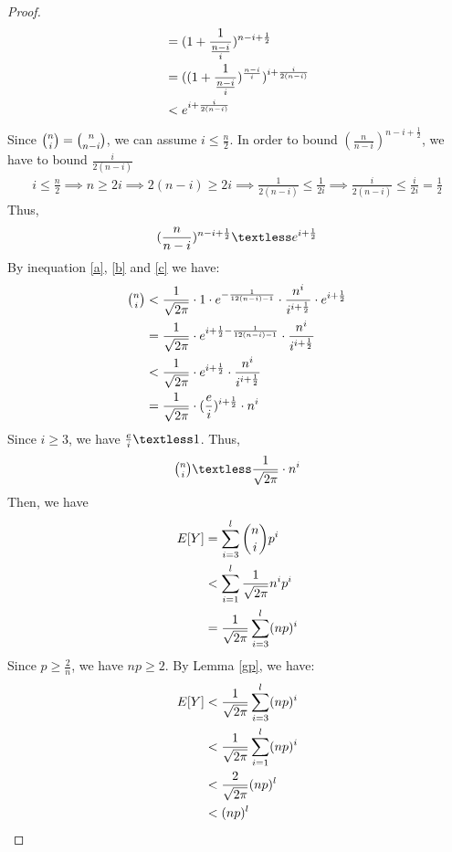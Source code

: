 \begin{proof}
\begin{align}
    \nonumber&= (1+\frac{1}{\frac{n-i}{i}})^{n-i+\frac{1}{2}}\\
    \nonumber&= ((1+\frac{1}{\frac{n-i}{i}})^{\frac{n-i}{i}})^{i+\frac{i}{2(n-i)}}\\
    \nonumber &\textless e^{i+\frac{i}{2(n-i)}}
\end{align}
Since $\tbinom{n}{i}=\tbinom{n}{n-i}$, 
we can assume $i\le \frac{n}{2}$. 
In order to bound $(\frac{n}{n-i})^{n-i+\frac{1}{2}}$, we have to bound $\frac{i}{2(n-i)}$
\begin{align}
   \nonumber i\le \frac{n}{2} 
   \implies n \ge 2i 
   \implies 2(n-i) \ge 2i \implies \frac{1}{2(n-i)} \le \frac{1}{2i} \implies  \frac{i}{2(n-i)} \le \frac{i}{2i} =\frac{1}{2}
\end{align}
Thus, 
\begin{align}
    (\frac{n}{n-i})^{n-i+\frac{1}{2}} \textless e^{i+\frac{1}{2}}\label{c}
\end{align}
By inequation \ref{a}, \ref{b} and \ref{c} we have:
\begin{align}
\nonumber \tbinom{n}{i} &\textless \frac{1}{\sqrt{2\pi}}\cdot 1\cdot e^{-\frac{1}{12(n-i)-1}} \cdot \frac{n^i}{i^{i+\frac{1}{2}}} \cdot e^{i+\frac{1}{2}}\\
\nonumber &= \frac{1}{\sqrt{2\pi}}\cdot e^{i+\frac{1}{2}-\frac{1}{12(n-i)-1}} \cdot \frac{n^i}{i^{i+\frac{1}{2}}}\\
\nonumber &\textless \frac{1}{\sqrt{2\pi}}\cdot e^{i+\frac{1}{2}} \cdot \frac{n^i}{i^{i+\frac{1}{2}}}\\
\nonumber &= \frac{1}{\sqrt{2\pi}}\cdot (\frac{e}{i})^{i+\frac{1}{2}}\cdot n^i
\end{align}
Since $i\ge 3$, we have $\frac{e}{i}\textless 1$. Thus,
\begin{align}
    \nonumber \tbinom{n}{i} \textless \frac{1}{\sqrt{2\pi}}\cdot n^i
\end{align}
Then, we have
\begin{align}
    \nonumber E[Y] &= \sum_{i = 3}^{l}{\binom{n}{i} p^i} 
    \\
    \nonumber &\textless \sum_{i=1}^{l}\frac{1}{\sqrt{2\pi}}n^ip^i\\
    \nonumber &= \frac{1}{\sqrt{2\pi}}\sum_{i=3}^{l}(np)^i
\end{align}
Since $p \ge \frac{2}{n}$, we have $np\ge 2$.
By Lemma \ref{gp}, we have:
\begin{align}
    \nonumber E[Y]& \textless   \frac{1}{\sqrt{2\pi}}\sum_{i=3}^{l}(np)^i \\
    \nonumber & \textless \frac{1}{\sqrt{2\pi}}\sum_{i=1}^{l}(np)^i \\
    \nonumber & \textless \frac{2}{\sqrt{2\pi}}(np)^l\\
    \nonumber & \textless (np)^l
\end{align}


\end{proof}
